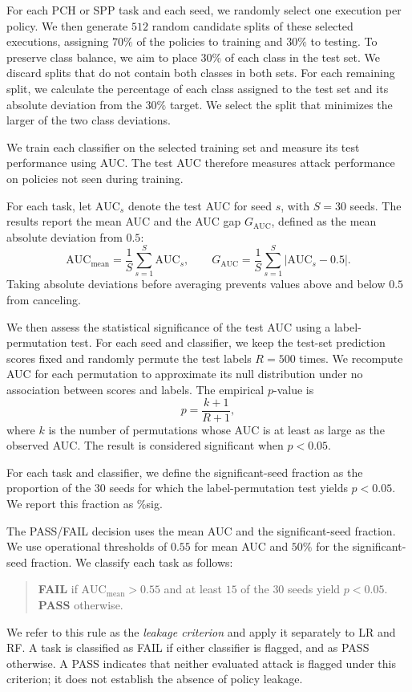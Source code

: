 For each PCH or SPP task and each seed, we randomly select one execution per policy.
We then generate $512$ random candidate splits of these selected executions, assigning $70\%$ of the policies to training and $30\%$ to testing.
To preserve class balance, we aim to place $30\%$ of each class in the test set.
We discard splits that do not contain both classes in both sets.
For each remaining split, we calculate the percentage of each class assigned to the test set and its absolute deviation from the $30\%$ target.
We select the split that minimizes the larger of the two class deviations.

We train each classifier on the selected training set and measure its test performance using AUC.
The test AUC therefore measures attack performance on policies not seen during training.

For each task, let $\mathrm{AUC}_s$ denote the test AUC for seed $s$, with $S=30$ seeds.
The results report the mean AUC and the AUC gap $G_{\mathrm{AUC}}$, defined as the mean absolute deviation from $0.5$:
\begin{equation}
	\mathrm{AUC}_{\text{mean}} = \frac{1}{S}\sum_{s=1}^{S}\mathrm{AUC}_s, \qquad
	G_{\mathrm{AUC}} = \frac{1}{S}\sum_{s=1}^{S}\left|\mathrm{AUC}_s-0.5\right|.
	\label{eq:auc-gap}
\end{equation}
Taking absolute deviations before averaging prevents values above and below $0.5$ from canceling.

We then assess the statistical significance of the test AUC using a label-permutation test.
For each seed and classifier, we keep the test-set prediction scores fixed and randomly permute the test labels $R=500$ times.
We recompute AUC for each permutation to approximate its null distribution under no association between scores and labels.
The empirical $p$-value is
\begin{equation}
	p = \frac{k+1}{R+1},
	\label{eq:perm-p}
\end{equation}
where $k$ is the number of permutations whose AUC is at least as large as the observed AUC.
The result is considered significant when $p<0.05$.

For each task and classifier, we define the significant-seed fraction as the proportion of the $30$ seeds for which the label-permutation test yields $p<0.05$.
We report this fraction as \%sig.

The PASS/FAIL decision uses the mean AUC and the significant-seed fraction.
We use operational thresholds of $0.55$ for mean AUC and $50\%$ for the significant-seed fraction.
We classify each task as follows:
%
\begin{quote}
	\textbf{FAIL} if $\mathrm{AUC}_{\text{mean}}>0.55$ and at least $15$ of the $30$ seeds yield $p<0.05$.
	\textbf{PASS} otherwise.
\end{quote}
%
We refer to this rule as the \emph{leakage criterion} and apply it separately to LR and RF.
A task is classified as FAIL if either classifier is flagged, and as PASS otherwise.
A PASS indicates that neither evaluated attack is flagged under this criterion; it does not establish the absence of policy leakage.

